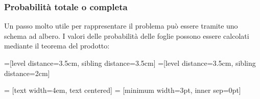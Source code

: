 \documentclass{article}     %
\begin{document}
                \subsubsection{Probabilità totale o completa}
                    \begin{ex}
                        
                        Un passo molto utile per rappresentare il problema può essere tramite uno schema ad albero. I valori delle probabilità delle foglie possono essere calcolati mediante il teorema del prodotto:
                        \begin{center}    
                            =[level distance=3.5cm, sibling distance=3.5cm]
                            =[level distance=3.5cm, sibling distance=2cm]
                            
                             = [text width=4em, text centered]
                             = [minimum width=3pt, inner sep=0pt]
                            

\end{center}
\end{ex}
\end{document}
